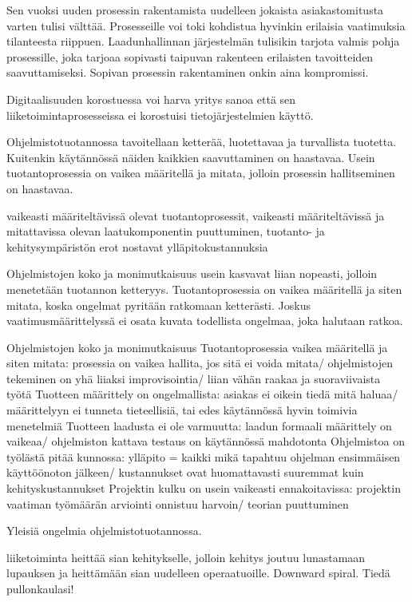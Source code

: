 \documentclass[finnish,12pt,a4paper,pdftex]{article}
\begin{document}
Sen vuoksi uuden prosessin rakentamista uudelleen jokaista asiakastomitusta varten tulisi välttää. Prosesseille voi toki kohdistua hyvinkin erilaisia vaatimuksia tilanteesta riippuen. Laadunhallinnan järjestelmän tulisikin tarjota valmis pohja prosessille, joka tarjoaa sopivasti taipuvan rakenteen erilaisten tavoitteiden saavuttamiseksi. Sopivan prosessin rakentaminen onkin aina kompromissi. 

Digitaalisuuden korostuessa voi harva yritys sanoa että sen liiketoimintaprosesseissa ei korostuisi tietojärjestelmien käyttö. 


Ohjelmistotuotannossa tavoitellaan ketterää, luotettavaa ja turvallista tuotetta. Kuitenkin käytännössä näiden kaikkien saavuttaminen on haastavaa. Usein tuotantoprosessia on vaikea määritellä ja mitata, jolloin prosessin hallitseminen on haastavaa. 

vaikeasti määriteltävissä olevat tuotantoprosessit, vaikeasti määriteltävissä ja mitattavissa olevan laatukomponentin puuttuminen, tuotanto- ja kehitysympäristön erot nostavat ylläpitokustannuksia 

Ohjelmistojen koko ja monimutkaisuus usein kasvavat liian nopeasti, jolloin menetetään tuotannon ketteryys. Tuotantoprosessia on vaikea määritellä ja siten mitata, koska ongelmat pyritään ratkomaan ketterästi. Joskus vaatimusmäärittelyssä ei osata kuvata todellista ongelmaa, joka halutaan ratkoa. 

Ohjelmistojen koko ja monimutkaisuus
Tuotantoprosessia vaikea määritellä ja siten mitata: prosessia on vaikea hallita, jos sitä ei voida mitata/ ohjelmistojen tekeminen on yhä liiaksi improvisointia/ liian vähän raakaa ja suoraviivaista työtä
Tuotteen määrittely on ongelmallista: asiakas ei oikein tiedä mitä haluaa/ määrittelyyn ei tunneta tieteellisiä, tai edes käytännössä hyvin toimivia menetelmiä
Tuotteen laadusta ei ole varmuutta: laadun formaali määrittely on vaikeaa/ ohjelmiston kattava testaus on käytännössä mahdotonta
Ohjelmistoa on työlästä pitää kunnossa: ylläpito = kaikki mikä tapahtuu ohjelman ensimmäisen käyttöönoton jälkeen/ kustannukset ovat huomattavasti suuremmat kuin kehityskustannukset
Projektin kulku on usein vaikeasti ennakoitavissa: projektin vaatiman työmäärän arviointi onnistuu harvoin/ teorian puuttuminen

Yleisiä ongelmia ohjelmistotuotannossa.

liiketoiminta heittää sian kehitykselle, jolloin kehitys joutuu lunastamaan lupauksen ja heittämään sian uudelleen operaatuoille. Downward spiral. Tiedä pullonkaulasi!
\end{document}
